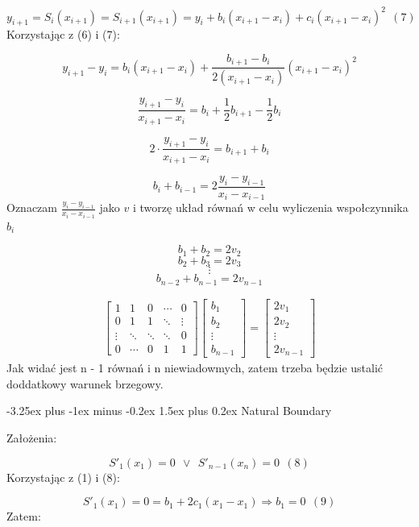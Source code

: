 \documentclass{article}
\makeatletter
\renewcommand{\paragraph}{\@startsection{paragraph}{4}{0ex}%
   {-3.25ex plus -1ex minus -0.2ex}%
   {1.5ex plus 0.2ex}%
   {\normalfont\normalsize\bfseries}}
\makeatother
\begin{document}
\[y_{i+1} = S_i(x_{i+1}) = S_{i+1}(x_{i+1}) = y_i + b_i(x_{i+1} - x_i) + c_i(x_{i+1}-x_i)^2 \ \ (7)\]
\noindent
Korzystając z (6) i (7):

\[y_{i+1} - y_i = b_i(x_{i+1}-x_i) + \frac{b_{i+1}-b_i}{2(x_{i+1}-x_i)}(x_{i+1}-x_i)^2\]

\[\frac{y_{i+1} - y_i}{x_{i+1}-x_i} = b_i + \frac{1}{2}b_{i+1} - \frac{1}{2}b_i\]

\[2\cdot \frac{y_{i+1} - y_i}{x_{i+1}-x_i} = b_{i+1}+b_i\]

\[b_i + b_{i-1} = 2\frac{y_i - y_{i-1}}{x_i - x_{i-1}}\]
\noindent
Oznaczam \(\frac{y_i - y_{i-1}}{x_i - x_{i-1}}\) jako \(v\) i tworzę układ równań w celu wyliczenia
wspołczynnika \(b_i\)

\bigbreak

\[b_1 + b_2 = 2v_2\]
\[b_2 + b_3 = 2v_3\]
\[\vdots\]
\[b_{n-2}+b_{n-1}=2v_{n-1}\]

\begin{gather*}
\begin{bmatrix}
1 & 1 & 0 & \cdots & 0 \\
0 & 1 & 1 & \ddots & \vdots \\
\vdots & \ddots & \ddots & \ddots & 0 \\
0 & \cdots & 0 & 1 & 1 
\end{bmatrix}  
\begin{bmatrix}
b_1 \\
b_2 \\
\vdots \\
b_{n-1} 
\end{bmatrix} 
=
\begin{bmatrix}
2v_1 \\
2v_2 \\
\vdots \\
2v_{n-1} 
\end{bmatrix}
\end{gather*}
\noindent
Jak widać jest n - 1 równań i n niewiadowmych, zatem trzeba będzie ustalić doddatkowy warunek brzegowy.

\paragraph{Natural Boundary}

Założenia:

\[S'_1(x_1) = 0 \ \ \vee \ \ S'_{n-1}(x_n) = 0 \ \ (8)\]
\noindent
Korzystając z (1) i (8):

\[S'_1(x_1) = 0 = b_1 + 2c_1(x_1-x_1) \Rightarrow b_1 = 0 \ \ (9)\]
\noindent
Zatem:
\end{document}
